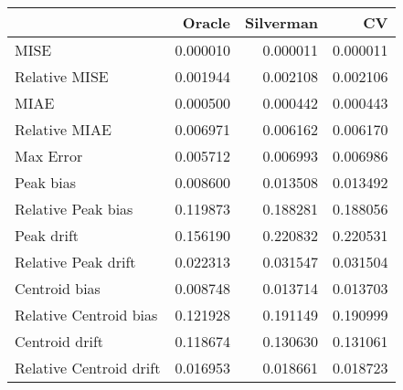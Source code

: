 \begin{tabular}{lrrr}
  \hline
 & Oracle & Silverman & CV \\ 
  \hline
MISE & 0.000010 & 0.000011 & 0.000011 \\ 
  Relative MISE & 0.001944 & 0.002108 & 0.002106 \\ 
  MIAE & 0.000500 & 0.000442 & 0.000443 \\ 
  Relative MIAE & 0.006971 & 0.006162 & 0.006170 \\ 
  Max Error & 0.005712 & 0.006993 & 0.006986 \\ 
  Peak bias & 0.008600 & 0.013508 & 0.013492 \\ 
  Relative Peak bias & 0.119873 & 0.188281 & 0.188056 \\ 
  Peak drift & 0.156190 & 0.220832 & 0.220531 \\ 
  Relative Peak drift & 0.022313 & 0.031547 & 0.031504 \\ 
  Centroid bias & 0.008748 & 0.013714 & 0.013703 \\ 
  Relative Centroid bias & 0.121928 & 0.191149 & 0.190999 \\ 
  Centroid drift & 0.118674 & 0.130630 & 0.131061 \\ 
  Relative Centroid drift & 0.016953 & 0.018661 & 0.018723 \\ 
   \hline
\end{tabular}
